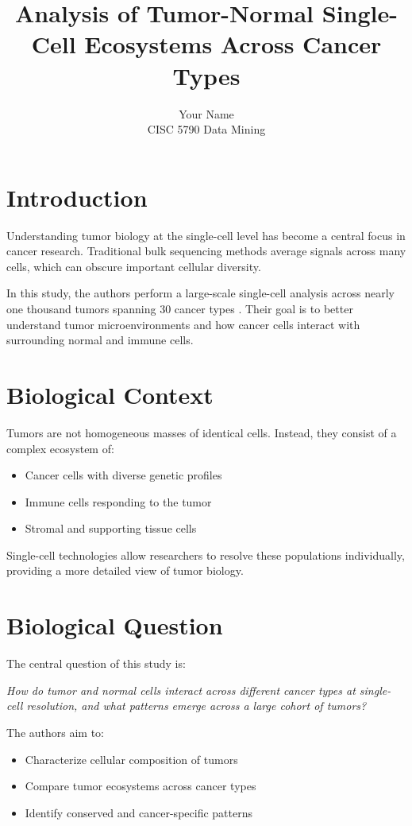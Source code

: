 \documentclass[12pt]{article}
\title{Analysis of Tumor-Normal Single-Cell Ecosystems Across Cancer Types}
\author{Your Name \\ CISC 5790 Data Mining}
\date{}
\begin{document}
\maketitle

\onehalfspacing

\section{Introduction}

Understanding tumor biology at the single-cell level has become a central focus in cancer research. 
Traditional bulk sequencing methods average signals across many cells, which can obscure important cellular diversity.

In this study, the authors perform a large-scale single-cell analysis across nearly one thousand tumors spanning 30 cancer types 
\cite{kang2024systematic}. Their goal is to better understand tumor microenvironments and how cancer cells interact with surrounding normal and immune cells.

\section{Biological Context}

Tumors are not homogeneous masses of identical cells. Instead, they consist of a complex ecosystem of:
\begin{itemize}
    \item Cancer cells with diverse genetic profiles
    \item Immune cells responding to the tumor
    \item Stromal and supporting tissue cells
\end{itemize}

Single-cell technologies allow researchers to resolve these populations individually, providing a more detailed view of tumor biology.

\section{Biological Question}

The central question of this study is:

\textit{How do tumor and normal cells interact across different cancer types at single-cell resolution, and what patterns emerge across a large cohort of tumors?}

The authors aim to:
\begin{itemize}
    \item Characterize cellular composition of tumors
    \item Compare tumor ecosystems across cancer types
    \item Identify conserved and cancer-specific patterns
\end{itemize}
\end{document}

